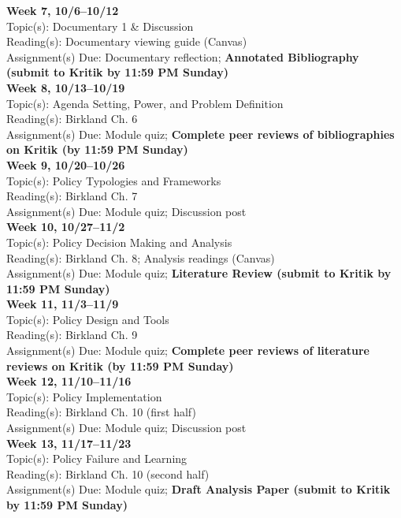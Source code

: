 \documentclass[12pt]{article}     %
\begin{document}
\noindent \textbf{Week 7, 10/6--10/12}\\
Topic(s): Documentary 1 \& Discussion\\
Reading(s): Documentary viewing guide (Canvas)\\
Assignment(s) Due: Documentary reflection; \textbf{Annotated Bibliography (submit to Kritik by 11:59 PM Sunday)}\\

\noindent \textbf{Week 8, 10/13--10/19}\\
Topic(s): Agenda Setting, Power, and Problem Definition\\
Reading(s): Birkland Ch. 6\\
Assignment(s) Due: Module quiz; \textbf{Complete peer reviews of bibliographies on Kritik (by 11:59 PM Sunday)}\\

\noindent \textbf{Week 9, 10/20--10/26}\\
Topic(s): Policy Typologies and Frameworks\\
Reading(s): Birkland Ch. 7\\
Assignment(s) Due: Module quiz; Discussion post\\

\noindent \textbf{Week 10, 10/27--11/2}\\
Topic(s): Policy Decision Making and Analysis\\
Reading(s): Birkland Ch. 8; Analysis readings (Canvas)\\
Assignment(s) Due: Module quiz; \textbf{Literature Review (submit to Kritik by 11:59 PM Sunday)}\\

\noindent \textbf{Week 11, 11/3--11/9}\\
Topic(s): Policy Design and Tools\\
Reading(s): Birkland Ch. 9\\
Assignment(s) Due: Module quiz; \textbf{Complete peer reviews of literature reviews on Kritik (by 11:59 PM Sunday)}\\

\noindent \textbf{Week 12, 11/10--11/16}\\
Topic(s): Policy Implementation\\
Reading(s): Birkland Ch. 10 (first half)\\
Assignment(s) Due: Module quiz; Discussion post\\

\noindent \textbf{Week 13, 11/17--11/23}\\
Topic(s): Policy Failure and Learning\\
Reading(s): Birkland Ch. 10 (second half)\\
Assignment(s) Due: Module quiz; \textbf{Draft Analysis Paper (submit to Kritik by 11:59 PM Sunday)}\\
\end{document}
